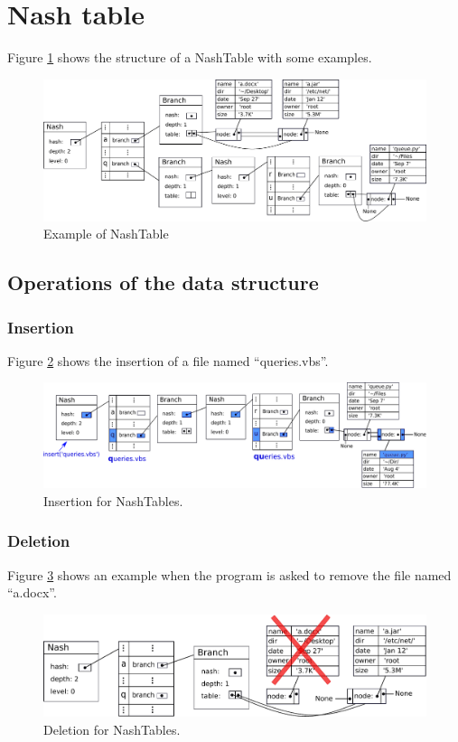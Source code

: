 \documentclass{sig-alternate-05-2015}
\begin{document}
  \section{Nash table}
  Figure \ref{img:nashT} shows the structure of a NashTable with some examples.
  \begin{figure}[t]
    \centering
    \includegraphics[scale=0.5]{NashTable.pdf}
    \caption{Example of NashTable}
    \label{img:nashT}
  \end{figure}

  \subsection{Operations of the data structure}

    \subsubsection{Insertion}
    Figure \ref{img:nashInsert} shows the insertion of a file named ``queries.vbs''.
    \begin{figure}[t]
      \centering
      \includegraphics[scale=0.445]{NashInsert.pdf}
      \caption{Insertion for NashTables.}
      \label{img:nashInsert}
    \end{figure}

  \subsubsection{Deletion}
  Figure \ref{img:nashRemove} shows an example when the program is asked to remove the file named
  ``a.docx''.
    \begin{figure}[t]
      \centering
      \includegraphics[scale=0.4]{NashRemove.pdf}
      \caption{Deletion for NashTables.}
      \label{img:nashRemove}
    \end{figure}
\end{document}
